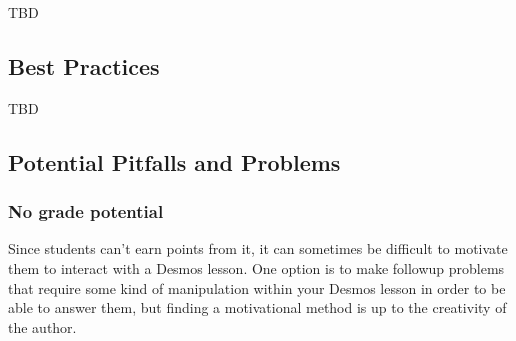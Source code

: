 \documentclass{ximera}
\begin{document}
        TBD
        
    \subsection*{Best Practices}
    
        TBD
        
    
    \subsection*{Potential Pitfalls and Problems}
        \subsubsection*{No grade potential}
            Since students can't earn points from it, it can sometimes be difficult to motivate them to interact with a Desmos lesson. One option is to make followup problems that require some kind of manipulation within your Desmos lesson in order to be able to answer them, but finding a motivational method is up to the creativity of the author.
    
\end{document}
